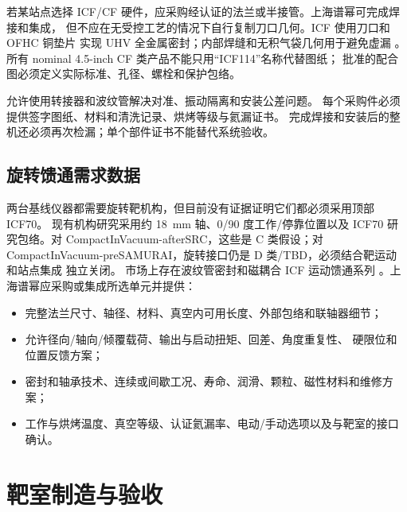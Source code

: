 \documentclass[UTF8,10pt,letterpaper,fontset=none]{ctexart}
\begin{document}
若某站点选择 ICF/CF 硬件，应采购经认证的法兰或半接管。上海谱幂可完成焊接和集成，
但不应在无受控工艺的情况下自行复制刀口几何。ICF 使用刀口和 OFHC 铜垫片
实现 UHV 全金属密封；内部焊缝和无积气袋几何用于避免虚漏
\cite{cosmotec_icf_standard,leybold_cf_hardware}。
所有 nominal 4.5-inch CF 类产品不能只用“ICF114”名称代替图纸；
批准的配合图必须定义实际标准、孔径、螺栓和保护包络。

允许使用转接器和波纹管解决对准、振动隔离和安装公差问题。
每个采购件必须提供签字图纸、材料和清洗记录、烘烤等级与氦漏证书。
完成焊接和安装后的整机还必须再次检漏；单个部件证书不能替代系统验收。

\subsection{旋转馈通需求数据}

两台基线仪器都需要旋转靶机构，但目前没有证据证明它们都必须采用顶部 ICF70。
现有机构研究采用约 \SI{18}{\milli\meter} 轴、0/90 度工作/停靠位置以及
ICF70 研究包络。对 CompactInVacuum-afterSRC，这些是 C 类假设；对
CompactInVacuum-preSAMURAI，旋转接口仍是 D 类/TBD，必须结合靶运动和站点集成
独立关闭。
市场上存在波纹管密封和磁耦合 ICF 运动馈通系列
\cite{cosmotec_motion_feedthrough}。上海谱幂应采购或集成所选单元并提供：
\begin{itemize}
  \item 完整法兰尺寸、轴径、材料、真空内可用长度、外部包络和联轴器细节；
  \item 允许径向/轴向/倾覆载荷、输出与启动扭矩、回差、角度重复性、
    硬限位和位置反馈方案；
  \item 密封和轴承技术、连续或间歇工况、寿命、润滑、颗粒、磁性材料和维修方案；
  \item 工作与烘烤温度、真空等级、认证氦漏率、电动/手动选项以及与靶室的接口确认。
\end{itemize}

\section{靶室制造与验收}
\end{document}
